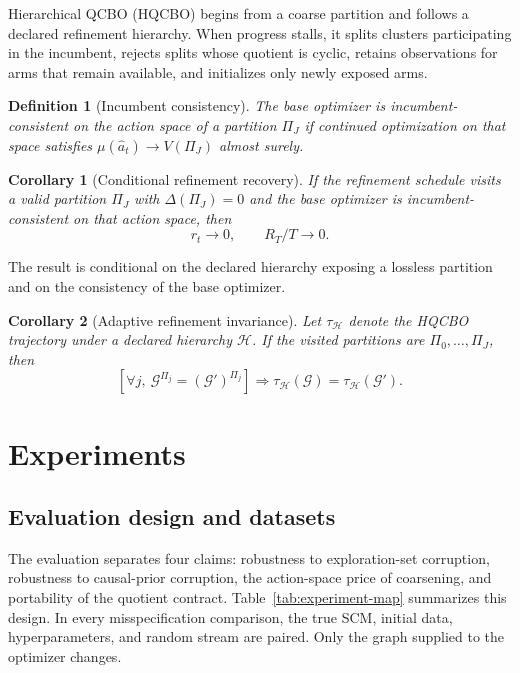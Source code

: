 \documentclass[twoside]{article}
\newtheorem{definition}{Definition}
\newtheorem{corollary}{Corollary}
\newcommand{\Gg}{\mathcal{G}}
\begin{document}
Hierarchical QCBO (HQCBO) begins from a coarse partition and follows a declared refinement hierarchy. When progress stalls, it splits clusters participating in the incumbent, rejects splits whose quotient is cyclic, retains observations for arms that remain available, and initializes only newly exposed arms.

\begin{definition}[Incumbent consistency]
\label{def:consistency}
The base optimizer is incumbent-consistent on the action space of a
partition $\Pi_J$ if continued optimization on that space satisfies
$\mu(\hat a_t)\to V(\Pi_J)$ almost surely.
\end{definition}

\begin{corollary}[Conditional refinement recovery]
\label{cor:recovery}
If the refinement schedule visits a valid partition $\Pi_J$ with
$\Delta(\Pi_J)=0$ and the base optimizer is incumbent-consistent on that
action space, then
\[
 r_t\longrightarrow0,
 \qquad R_T/T\longrightarrow0.
\]
\end{corollary}

The result is conditional on the declared hierarchy exposing a lossless partition and on the consistency of the base optimizer.

\begin{corollary}[Adaptive refinement invariance]
\label{cor:adaptive-invariance}
Let $\tau_{\mathcal H}$ denote the HQCBO trajectory under a declared
hierarchy $\mathcal H$. If the visited partitions are
$\Pi_0,\ldots,\Pi_J$, then
\[
 \left[\forall j,\ \Gg^{\Pi_j}=(\Gg')^{\Pi_j}\right]
 \Longrightarrow
 \tau_{\mathcal H}(\Gg)=\tau_{\mathcal H}(\Gg').
\]
\end{corollary}

\section{Experiments}
\label{sec:experiments}

\subsection{Evaluation design and datasets}
\label{sec:exp-design}

The evaluation separates four claims: robustness to exploration-set corruption, robustness to causal-prior corruption, the action-space price of coarsening, and portability of the quotient contract. Table~\ref{tab:experiment-map} summarizes this design. In every misspecification comparison, the true SCM, initial data, hyperparameters, and random stream are paired. Only the graph supplied to the optimizer changes.
\end{document}
